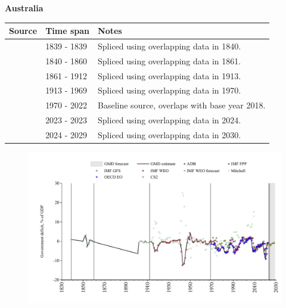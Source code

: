 \documentclass[12pt,a4paper,landscape]{article}
\begin{document}
\begin{adjustbox}{max totalsize={\paperwidth}{\paperheight},center}
\begin{minipage}[t][\textheight][t]{\textwidth}
\vspace*{0.5cm}
{}
\begin{center}
{\Large\bfseries Australia}
\end{center}
\vspace{0.5cm}
\begin{table}[H]
\centering
\small
\begin{tabular}{|l|l|l|}
\hline
\textbf{Source} & \textbf{Time span} & \textbf{Notes} \\
\hline
\rowcolor{white}\cite{Mitchell}& 1839 - 1839 &Spliced using overlapping data in 1840.\\
\rowcolor{lightgray}\cite{CS2_AUS}& 1840 - 1860 &Spliced using overlapping data in 1861.\\
\rowcolor{white}\cite{Mitchell}& 1861 - 1912 &Spliced using overlapping data in 1913.\\
\rowcolor{lightgray}\cite{IMF_FPP}& 1913 - 1969 &Spliced using overlapping data in 1970.\\
\rowcolor{white}\cite{OECD_EO}& 1970 - 2022 &Baseline source, overlaps with base year 2018.\\
\rowcolor{lightgray}\cite{IMF_FPP}& 2023 - 2023 &Spliced using overlapping data in 2024.\\
\rowcolor{white}\cite{IMF_WEO_forecast}& 2024 - 2029 &Spliced using overlapping data in 2030.\\
\hline
\end{tabular}
\end{table}
\begin{figure}[H]
\centering
\includegraphics[width=\textwidth,height=0.6\textheight,keepaspectratio]{graphs/AUS_govdef_GDP.pdf}
\end{figure}
\end{minipage}
\end{adjustbox}
\end{document}
